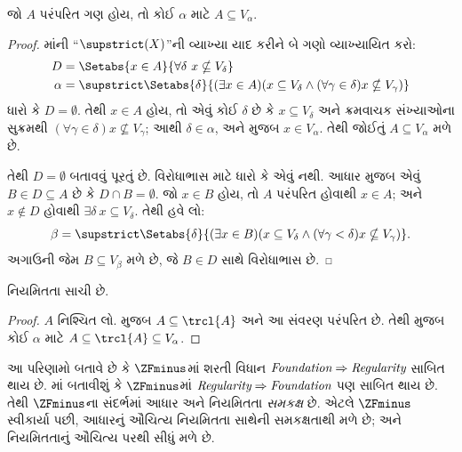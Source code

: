 \begin{lem}
જો $A$ પરંપરિત ગણ હોય, તો કોઈ $\alpha$ માટે $A
\subseteq V_\alpha$.
\end{lem}

\begin{proof}
માંની
``$\supstrict(X)$''ની વ્યાખ્યા યાદ કરીને બે ગણો વ્યાખ્યાયિત કરો:
\begin{align*}
	D  &= \Setabs{x \in A}{\forall \delta\ x \nsubseteq V_\delta}\\
	\alpha &= \supstrict\Setabs{\delta}{(\exists x \in A)
	(x \subseteq V_\delta \land (\forall \gamma \in \delta)x \nsubseteq V_\gamma)}
\end{align*}
ધારો કે $D = \emptyset$. તેથી $x \in A$ હોય, તો એવું કોઈ
$\delta$ છે કે $x \subseteq V_\delta$ અને ક્રમવાચક સંખ્યાઓના
સુક્રમથી $(\forall \gamma \in \delta)x \nsubseteq V_\gamma$;
આથી $\delta \in \alpha$, અને
 મુજબ
$x \in V_\alpha$. તેથી જોઈતું $A \subseteq
V_{\alpha}$ મળે છે.

તેથી $D = \emptyset$ બતાવવું પૂરતું છે. વિરોધાભાસ માટે ધારો કે
એવું નથી. આધાર મુજબ એવું $B \in D \subseteq A$ છે કે $D \cap B
= \emptyset$. જો $x \in B$ હોય, તો $A$ પરંપરિત હોવાથી
$x \in A$; અને $x \notin D$ હોવાથી
$\exists \delta\ x \subseteq
V_\delta$. તેથી હવે લો:
\[
	\beta = \supstrict\Setabs{\delta}{(\exists x \in B)(x \subseteq V_\delta \land (\forall \gamma < \delta)x \nsubseteq V_\gamma)}.
\]
અગાઉની જેમ $B \subseteq V_\beta$ મળે છે, જે $B \in
D$ સાથે વિરોધાભાસ છે.
\end{proof}

\begin{thm}
નિયમિતતા સાચી છે.
\end{thm}

\begin{proof}
$A$ નિશ્ચિત લો.  મુજબ
$A \subseteq \trcl{A}$ અને આ સંવરણ પરંપરિત છે. તેથી
 મુજબ કોઈ $\alpha$ માટે
$A \subseteq \trcl{A} \subseteq V_\alpha$.
\end{proof}

આ પરિણામો બતાવે છે કે $\ZFminus$માં શરતી વિધાન
$\emph{Foundation}\Rightarrow\emph{Regularity}$ સાબિત થાય છે.
માં બતાવીશું કે
$\ZFminus$માં $\emph{Regularity}\Rightarrow\emph{Foundation}$
પણ સાબિત થાય છે. તેથી $\ZFminus$ના સંદર્ભમાં આધાર અને
નિયમિતતા \emph{સમકક્ષ} છે. એટલે $\ZFminus$ સ્વીકાર્યા પછી,
આધારનું ઔચિત્ય નિયમિતતા સાથેની સમકક્ષતાથી મળે છે; અને
નિયમિતતાનું ઔચિત્ય \stageshier{} પરથી સીધું મળે છે.
\endgroup


